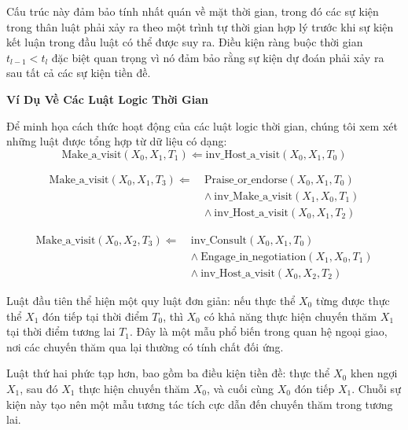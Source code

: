Cấu trúc này đảm bảo tính nhất quán về mặt thời gian, trong đó các sự kiện trong thân luật phải xảy ra theo một trình tự thời gian hợp lý trước khi sự kiện kết luận trong đầu luật có thể được suy ra. Điều kiện ràng buộc thời gian $t_{l-1} < t_l$ đặc biệt quan trọng vì nó đảm bảo rằng sự kiện dự đoán phải xảy ra sau tất cả các sự kiện tiền đề.

\textbf{Ví Dụ Về Các Luật Logic Thời Gian}

Để minh họa cách thức hoạt động của các luật logic thời gian, chúng tôi xem xét những luật được tổng hợp từ dữ liệu có dạng:\begin{equation}
\text{Make\_a\_visit}(X_0, X_1, T_1) \Leftarrow \text{inv\_Host\_a\_visit}(X_0, X_1, T_0)
\tag{1}
\label{rule1}
\end{equation}

\begin{equation}
\begin{aligned}
\text{Make\_a\_visit}(X_0, X_1, T_3) \Leftarrow\ &\text{Praise\_or\_endorse}(X_0, X_1, T_0) \\
&\land\ \text{inv\_Make\_a\_visit}(X_1, X_0, T_1) \\
&\land\ \text{inv\_Host\_a\_visit}(X_0, X_1, T_2)
\end{aligned}
\tag{2}
\label{rule2}
\end{equation}

\begin{equation}
\begin{aligned}
\text{Make\_a\_visit}(X_0, X_2, T_3) \Leftarrow\ &\text{inv\_Consult}(X_0, X_1, T_0) \\
&\land\ \text{Engage\_in\_negotiation}(X_1, X_0, T_1) \\
&\land\ \text{inv\_Host\_a\_visit}(X_0, X_2, T_2)
\end{aligned}
\tag{3}
\label{rule3}
\end{equation}


Luật đầu tiên thể hiện một quy luật đơn giản: nếu thực thể $X_0$ từng được thực thể $X_1$ đón tiếp tại thời điểm $T_0$, thì $X_0$ có khả năng thực hiện chuyến thăm $X_1$ tại thời điểm tương lai $T_1$. Đây là một mẫu phổ biến trong quan hệ ngoại giao, nơi các chuyến thăm qua lại thường có tính chất đối ứng.

Luật thứ hai phức tạp hơn, bao gồm ba điều kiện tiền đề: thực thể $X_0$ khen ngợi $X_1$, sau đó $X_1$ thực hiện chuyến thăm $X_0$, và cuối cùng $X_0$ đón tiếp $X_1$. Chuỗi sự kiện này tạo nên một mẫu tương tác tích cực dẫn đến chuyến thăm trong tương lai.

